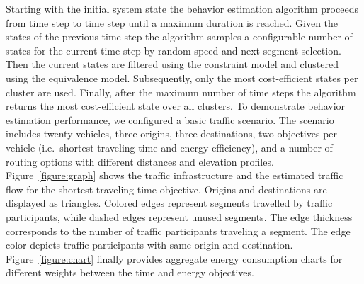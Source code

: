 \documentclass[conference]{../cls/IEEEtran}
\begin{document}
Starting with the initial system state the behavior estimation algorithm proceeds from time step to time step until a maximum duration is reached. Given the states of the previous time step the algorithm samples a configurable number of states for the current time step by random speed and next segment selection. Then the current states are filtered using the constraint model and clustered using the equivalence model. Subsequently, only the most cost-efficient states per cluster are used. Finally, after the maximum number of time steps the algorithm returns the most cost-efficient state over all clusters. To demonstrate behavior estimation performance, we configured a basic traffic scenario. The scenario includes twenty vehicles, three origins, three destinations, two objectives per vehicle (i.e.\ shortest traveling time and energy-efficiency), and a number of routing options with different distances and elevation profiles. Figure~\ref{figure:graph} shows the traffic infrastructure and the estimated traffic flow for the shortest traveling time objective. Origins and destinations are displayed as triangles. Colored edges represent segments travelled by traffic participants, while dashed edges represent unused segments. The edge thickness corresponds to the number of traffic participants traveling a segment. The edge color depicts traffic participants with same origin and destination. Figure~\ref{figure:chart} finally provides aggregate energy consumption charts for different weights between the time and energy objectives.

\end{document}
